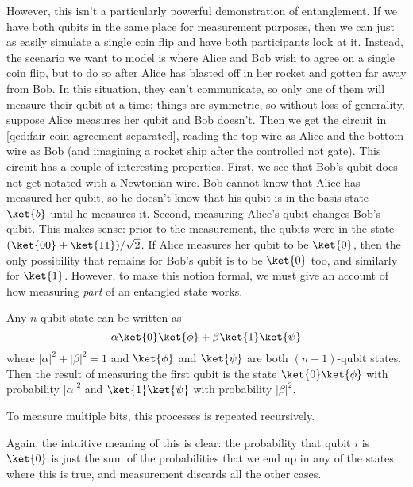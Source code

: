However, this isn't a particularly powerful demonstration of entanglement.  If
we have both qubits in the same place for measurement purposes, then we can just
as easily simulate a single coin flip and have both participants look at it.
Instead, the scenario we want to model is where Alice and Bob wish to agree on a
single coin flip, but to do so after Alice has blasted off in her rocket and
gotten far away from Bob.  In this situation, they can't communicate, so only
one of them will measure their qubit at a time; things are symmetric, so without
loss of generality, suppose Alice measures her qubit and Bob doesn't.  Then we
get the circuit in \cref{qcd:fair-coin-agreement-separated}, reading the top
wire as Alice and the bottom wire as Bob (and imagining a rocket ship after the
controlled not gate).  This circuit has a couple of interesting properties.
First, we see that Bob's qubit does not get notated with a Newtonian wire.  Bob
cannot know that Alice has measured her qubit, so he doesn't know that his qubit
is in the basis state $\ket{b}$ until he measures it.  Second, measuring Alice's
qubit changes Bob's qubit.  This makes sense: prior to the measurement, the
qubits were in the state $(\ket{00} + \ket{11})/\sqrt{2}$.  If Alice measures
her qubit to be $\ket{0}$, then the only possibility that remains for Bob's
qubit is to be $\ket{0}$ too, and similarly for $\ket{1}$.  However, to make
this notion formal, we must give an account of how measuring \emph{part} of an
entangled state works.

\begin{definition}\label{def:partial-measurement}
Any $n$-qubit state can be written as
\[
    \alpha \ket{0} \ket{\phi}
    + \beta \ket{1} \ket{\psi}
\]
where $|\alpha|^2 + |\beta|^2 = 1$ and $\ket{\phi}$ and $\ket{\psi}$ are both $(n-1)$-qubit states.
Then the result of measuring the first qubit is the state
$\ket{0} \ket{\phi}$ with probability $|\alpha|^2$ and
$\ket{1} \ket{\psi}$ with probability $|\beta|^2$.

To measure multiple bits, this processes is repeated recursively.
\end{definition}

Again, the intuitive meaning of this is clear: the probability that qubit $i$ is
$\ket{0}$ is just the sum of the probabilities that we end up in any of the
states where this is true, and measurement discards all the other cases.  

